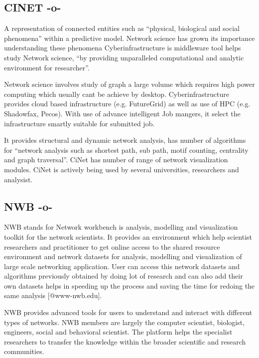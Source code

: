 \subsection{CINET -o-}

A representation of connected entities such as ``physical, biological
and social phenomena'' within a predictive
model\cite{www-bi-vt-edu}. Network science has grown its importance
understanding these phenomena Cyberinfrastructure is middleware tool
helps study Network science, ``by providing unparalleled computational
and analytic environment for
researcher''\cite{www-portal-futuresystems-org-projects-233}.
 
Network science involves study of graph a large volume which requires
high power computing which usually cant be achieve by
desktop. Cyberinfrastructure provides cloud based infrastructure
(e.g. FutureGrid) as well as use of HPC (e.g. Shadowfax, Pecos). With
use of advance intelligent Job mangers, it select the infrastructure
smartly suitable for submitted job.
     
It provides structural and dynamic network analysis, has number of
algorithms for ``network analysis such as shortest path, sub path,
motif counting, centrality and graph traversal''. CiNet has number of
range of network visualization modules.  CiNet is actively being used
by several universities, researchers and analysist.



\subsection{NWB -o-}

NWB stands for Network workbench is analysis, modelling and
visualization toolkit for the network scientists.  It provides an
environment which help scientist researchers and practitioner to get
online access to the shared resource environment and network datasets
for analysis, modelling and visualization of large scale networking
application.  User can access this network datasets and algorithms
previously obtained by doing lot of research and can also add their
own datasets helps in speeding up the process and saving the time for
redoing the same analysis [@www-nwb.edu].

NWB provides advanced tools for users to understand and interact with
different types of networks.  NWB members are largely the computer
scientist, biologist, engineers, social and behavioral scientist. The
platform helps the specialist researchers to transfer the knowledge
within the broader scientific and research communities.


